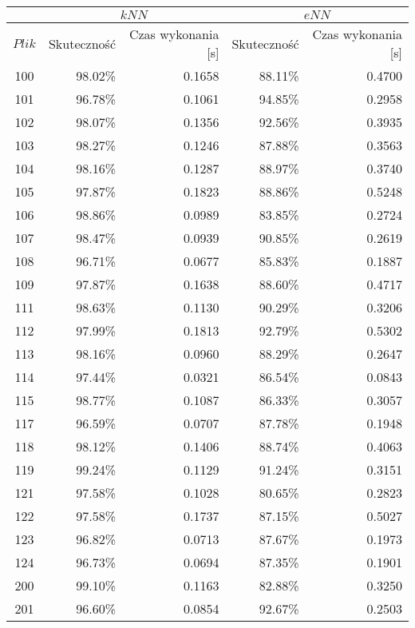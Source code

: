\begin{table}[!htb]
	\centering
	\begin{tabular}{|c|r|r|r|r|}
		\hline
		& \multicolumn{2}{c|}{$kNN$} & \multicolumn{2}{c|}{$eNN$} \\
		\hline
		$Plik$ & Skuteczność & Czas wykonania [s] & Skuteczność & Czas wykonania [s] \\
		\hline
100 &  98.02\% & 0.1658 &  88.11\% & 0.4700 \\ 
\hline
101 &  96.78\% & 0.1061 &  94.85\% & 0.2958 \\ 
\hline
102 &  98.07\% & 0.1356 &  92.56\% & 0.3935 \\ 
\hline
103 &  98.27\% & 0.1246 &  87.88\% & 0.3563 \\ 
\hline
104 &  98.16\% & 0.1287 &  88.97\% & 0.3740 \\ 
\hline
105 &  97.87\% & 0.1823 &  88.86\% & 0.5248 \\ 
\hline
106 &  98.86\% & 0.0989 &  83.85\% & 0.2724 \\ 
\hline
107 &  98.47\% & 0.0939 &  90.85\% & 0.2619 \\ 
\hline
108 &  96.71\% & 0.0677 &  85.83\% & 0.1887 \\ 
\hline
109 &  97.87\% & 0.1638 &  88.60\% & 0.4717 \\ 
\hline
111 &  98.63\% & 0.1130 &  90.29\% & 0.3206 \\ 
\hline
112 &  97.99\% & 0.1813 &  92.79\% & 0.5302 \\ 
\hline
113 &  98.16\% & 0.0960 &  88.29\% & 0.2647 \\ 
\hline
114 &  97.44\% & 0.0321 &  86.54\% & 0.0843 \\ 
\hline
115 &  98.77\% & 0.1087 &  86.33\% & 0.3057 \\ 
\hline
117 &  96.59\% & 0.0707 &  87.78\% & 0.1948 \\ 
\hline
118 &  98.12\% & 0.1406 &  88.74\% & 0.4063 \\ 
\hline
119 &  99.24\% & 0.1129 &  91.24\% & 0.3151 \\ 
\hline
121 &  97.58\% & 0.1028 &  80.65\% & 0.2823 \\ 
\hline
122 &  97.58\% & 0.1737 &  87.15\% & 0.5027 \\ 
\hline
123 &  96.82\% & 0.0713 &  87.67\% & 0.1973 \\ 
\hline
124 &  96.73\% & 0.0694 &  87.35\% & 0.1901 \\ 
\hline
200 &  99.10\% & 0.1163 &  82.88\% & 0.3250 \\ 
\hline
201 &  96.60\% & 0.0854 &  92.67\% & 0.2503 \\ 

\end{tabular}
\end{table}
